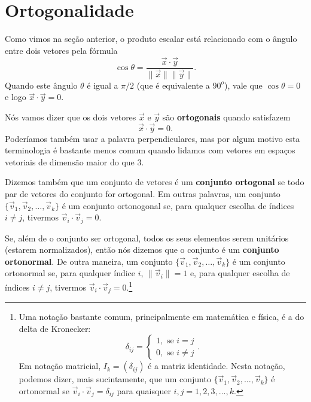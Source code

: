 \documentclass[../livro.tex]{subfiles}  %
\begin{document}
\section{Ortogonalidade}

Como vimos na seção anterior, o produto escalar está relacionado com o ângulo entre dois vetores pela fórmula
\begin{equation}
\cos \theta = \frac{\vec{x} \cdot \vec{y}}{\|\vec{x}\| \|\vec{y}\|}.
\end{equation} Quando este ângulo $\theta$ é igual a $\pi /2$ (que é equivalente a $90^o$), vale que $\cos \theta = 0$ e logo $\vec{x} \cdot \vec{y} = 0$.

Nós vamos dizer que os dois vetores $\vec{x}$ e $\vec{y}$ são \textbf{ortogonais} quando satisfazem
\begin{equation}
\vec{x} \cdot \vec{y} = 0.
\end{equation} Poderíamos também usar a palavra perpendiculares, mas por algum motivo esta terminologia é bastante menos comum quando lidamos com vetores em espaços vetoriais de dimensão maior do que $3$.

Dizemos também que um conjunto de vetores é um \textbf{conjunto ortogonal} se todo par de vetores do conjunto for ortogonal. Em outras palavras, um conjunto $\{\vec{v}_1, \vec{v}_2, \dots, \vec{v}_k\}$ é um conjunto ortonogonal se, para qualquer escolha de índices $i \neq j$, tivermos $\vec{v}_i \cdot \vec{v}_j = 0$.

Se, além de o conjunto ser ortogonal, todos os seus elementos serem unitários (estarem normalizados), então nós dizemos que o conjunto é um \textbf{conjunto ortonormal}. De outra maneira, um conjunto $\{\vec{v}_1, \vec{v}_2, \dots, \vec{v}_k\}$ é um conjunto ortonormal se, para qualquer índice $i$, $\|\vec{v}_i\| = 1$ e, para qualquer escolha de índices $i \neq j$, tivermos $\vec{v}_i \cdot \vec{v}_j = 0$.\footnote{Uma notação bastante comum, principalmente em matemática e física, é a do delta de Kronecker:\begin{equation} \delta_{ij} = \left\lbrace \begin{array}{l}
	1, \text{ se } i = j \\
	0, \text{ se } i \neq j
	\end{array} \right. . \end{equation} Em notação matricial, $I_k = (\delta_{ij})$ é a matriz identidade. Nesta notação, podemos dizer, mais sucintamente, que um conjunto $\{\vec{v}_1, \vec{v}_2, \dots, \vec{v}_k\}$ é ortonormal se $\vec{v}_i \cdot \vec{v}_j = \delta_{ij}$ para quaisquer $i,j = 1, 2, 3, \dots, k$.}
\end{document}

